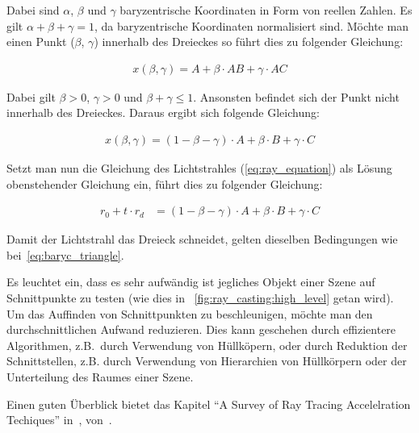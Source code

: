 Dabei sind $\alpha{}$, $\beta{}$ und $\gamma{}$ baryzentrische
Koordinaten in Form von reellen Zahlen. Es gilt $\alpha{} + \beta{} +
\gamma{} = 1$, da baryzentrische Koordinaten normalisiert sind. Möchte
man einen Punkt ($\beta{}$, $\gamma{}$) innerhalb des Dreieckes so
führt dies zu folgender Gleichung:

\begin{gather}\label{eq:baryc_triangle}
    x(\beta, \gamma) = A + \beta{} \cdot{} AB + \gamma{} \cdot{} AC
\end{gather}

Dabei gilt $\beta{} > 0$, $\gamma{} >0$ und $\beta{} + \gamma{} \leq 1$.
Ansonsten befindet sich der Punkt nicht innerhalb des Dreieckes.
Daraus ergibt sich folgende Gleichung:

\begin{gather}
    x(\beta, \gamma) = (1 - \beta{} - \gamma{}) \cdot{} A + \beta{} \cdot{} B + \gamma{} \cdot{} C
\end{gather}

Setzt man nun die Gleichung des Lichtstrahles (\ref{eq:ray_equation})
als Lösung obenstehender Gleichung ein, führt dies zu folgender Gleichung:

\begin{align}
    r_{0} + t \cdot r_{d} &= (1 - \beta{} - \gamma{}) \cdot{} A + \beta{} \cdot{} B + \gamma{} \cdot{} C
\end{align}

Damit der Lichtstrahl das Dreieck schneidet, gelten dieselben
Bedingungen wie bei~\autoref{eq:baryc_triangle}.

Es leuchtet ein, dass es sehr aufwändig ist jegliches Objekt einer Szene
auf Schnittpunkte zu testen (wie dies in
~\autoref{fig:ray_casting:high_level} getan wird). Um das Auffinden von
Schnittpunkten zu beschleunigen, möchte man den durchschnittlichen
Aufwand reduzieren. Dies kann geschehen durch effizientere Algorithmen,
z.B.~durch Verwendung von Hüllköpern, oder durch Reduktion der
Schnittstellen, z.B. durch Verwendung von Hierarchien von Hüllkörpern
oder der Unterteilung des Raumes einer Szene.

Einen guten Überblick bietet das Kapitel ``A Survey of Ray Tracing
Accelelration Techiques'' in~,
von~\cite{glassner_introduction_1989}.

